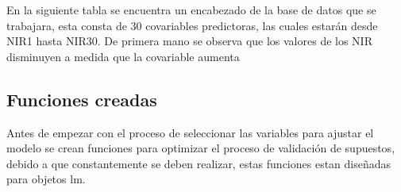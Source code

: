\documentclass[
]{article}
\newenvironment{Shaded}{\begin{snugshade}}{\end{snugshade}}
\newcommand{\AttributeTok}[1]{\textcolor[rgb]{0.77,0.63,0.00}{#1}}
\newcommand{\DecValTok}[1]{\textcolor[rgb]{0.00,0.00,0.81}{#1}}
\newcommand{\FunctionTok}[1]{\textcolor[rgb]{0.00,0.00,0.00}{#1}}
\newcommand{\NormalTok}[1]{#1}
\newcommand{\OtherTok}[1]{\textcolor[rgb]{0.56,0.35,0.01}{#1}}
\newcommand{\SpecialCharTok}[1]{\textcolor[rgb]{0.00,0.00,0.00}{#1}}
\newcommand{\StringTok}[1]{\textcolor[rgb]{0.31,0.60,0.02}{#1}}
\begin{document}
En la siguiente tabla se encuentra un encabezado de la base de datos que
se trabajara, esta consta de 30 covariables predictoras, las cuales
estarán desde NIR1 hasta NIR30. De primera mano se observa que los
valores de los NIR disminuyen a medida que la covariable aumenta

\begin{Shaded}
\end{Shaded}

\hypertarget{funciones-creadas}{%
\subsection{Funciones creadas}\label{funciones-creadas}}

Antes de empezar con el proceso de seleccionar las variables para
ajustar el modelo se crean funciones para optimizar el proceso de
validación de supuestos, debido a que constantemente se deben realizar,
estas funciones estan diseñadas para objetos lm.
\end{document}
